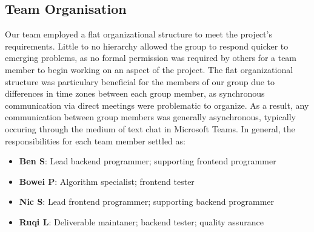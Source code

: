 \documentclass{article}
\begin{document}
\subsection{Team Organisation}
Our team employed a flat organizational structure to meet the project's
requirements. Little to no hierarchy allowed the group to respond quicker
to emerging problems, as no formal permission was required by others for
a team member to begin working on an aspect of the project. The flat
organizational structure was particulary beneficial for the members of our
group due to differences in time zones between each group member, as
synchronous communication via direct meetings were problematic to organize.
As a result, any communication between group members was generally
asynchronous, typically occuring through the medium of text chat in Microsoft
Teams. In general, the responsibilities for each team member settled as:
\begin{itemize}
\item \textbf{Ben S}: Lead backend programmer; supporting frontend programmer
\item \textbf{Bowei P}: Algorithm specialist; frontend tester
\item \textbf{Nic S}: Lead frontend programmer; supporting backend programmer
\item \textbf{Ruqi L}: Deliverable maintaner; backend tester; quality
assurance
\end{itemize}
\end{document}
